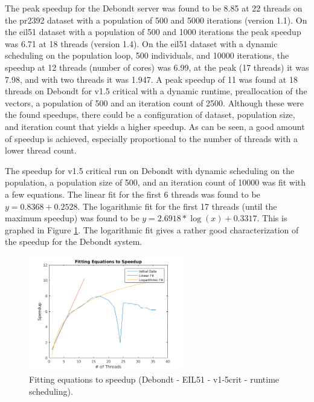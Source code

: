 \documentclass[10pt,letterpaper]{article}
\begin{document}
The peak speedup for the Debondt server was found to be 8.85 at 22 threads on the pr2392 dataset with a population of 500 and 5000 iterations (version 1.1). On the eil51 dataset with a population of 500 and 1000 iterations the peak speedup was 6.71 at 18 threads (version 1.4). On the eil51 dataset with a dynamic scheduling on the population loop, 500 individuals, and 10000 iterations, the speedup at 12 threads (number of cores) was 6.99, at the peak (17 threads) it was 7.98, and with two threads it was 1.947. A peak speedup of 11 was found at 18 threads on Debondt for v1.5 critical with a dynamic runtime, preallocation of the vectors, a population of 500 and an iteration count of 2500. Although these were the found speedups, there could be a configuration of dataset, population size, and iteration count that yields a higher speedup. As can be seen, a good amount of speedup is achieved, especially proportional to the number of threads with a lower thread count.

The speedup for v1.5 critical run on Debondt with dynamic scheduling on the population, a population size of 500, and an iteration count of 10000 was fit with a few equations. The linear fit for the first 6 threads was found to be $ y = 0.8368 + 0.2528 $. The logarithmic fit for the first 17 threads (until the maximum speedup) was found to be $y = 2.6918*\log(x) + 0.3317$. This is graphed in Figure \ref{fig:linefits}. The logarithmic fit gives a rather good characterization of the speedup for the Debondt system.

\begin{figure}
\centering
\includegraphics[width=0.6\textwidth]{../img/Debondt_fitting_v1-5crit_runtimepop.png}
\caption{Fitting equations to speedup (Debondt - EIL51 - v1-5crit - runtime scheduling).}
\label{fig:linefits}
\end{figure}
\end{document}
